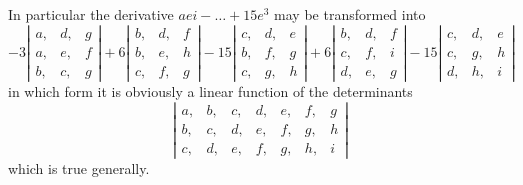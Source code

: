 \documentclass[11pt,a4paper]{book}
\begin{document}
In particular the derivative $aei - \ldots + 15e^3$ may be transformed into
\[
-3\left|\begin{array}{ccc}
a, & d, & g \\
a, & e, & f \\
b, & c, & g
\end{array}\right|
+ 6
\left|\begin{array}{ccc}
b, & d, & f \\
b, & e, & h \\
c, & f, & g
\end{array}\right|
- 15
\left|\begin{array}{ccc}
c, & d, & e \\
b, & f, & g \\
c, & g, & h
\end{array}\right|
+ 6
\left|\begin{array}{ccc}
b, & d, & f \\
c, & f, & i \\
d, & e, & g
\end{array}\right|
- 15
\left|\begin{array}{ccc}
c, & d, & e \\
c, & g, & h \\
d, & h, & i
\end{array}\right|
\]
in which form it is obviously a linear function of the determinants
\[
\left|\begin{array}{ccccccc}
a, & b, & c, & d, & e, & f, & g \\
b, & c, & d, & e, & f, & g, & h \\
c, & d, & e, & f, & g, & h, & i
\end{array}\right|
\]
which is true generally.
\end{document}
